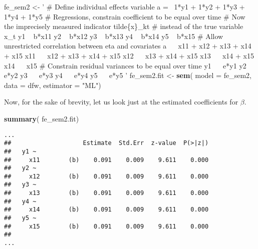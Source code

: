\documentclass[]{interact}
\theoremstyle{plain}%
\theoremstyle{definition}
\theoremstyle{remark}
\newenvironment{Shaded}{\begin{snugshade}}{\end{snugshade}}
\newcommand{\DataTypeTok}[1]{\textcolor[rgb]{0.13,0.29,0.53}{#1}}
\newcommand{\KeywordTok}[1]{\textcolor[rgb]{0.13,0.29,0.53}{\textbf{#1}}}
\newcommand{\NormalTok}[1]{#1}
\newcommand{\StringTok}[1]{\textcolor[rgb]{0.31,0.60,0.02}{#1}}
\begin{document}
\begin{Shaded}
\begin{Highlighting}[]
\NormalTok{fe_sem2 <-}\StringTok{ '}
\StringTok{# Define individual effects variable }
\StringTok{a =~ 1*y1 + 1*y2 + 1*y3 + 1*y4 + 1*y5}
\StringTok{# Regressions, constrain coefficient to be equal over time}
\StringTok{# Now the imprecisely measured indicator tilde\{x\}_kt}
\StringTok{# instead of the true variable x_t}
\StringTok{y1 ~ b*x11 }
\StringTok{y2 ~ b*x12 }
\StringTok{y3 ~ b*x13}
\StringTok{y4 ~ b*x14}
\StringTok{y5 ~ b*x15}
\StringTok{# Allow unrestricted correlation between eta and covariates}
\StringTok{a ~~ x11 + x12 + x13 + x14 + x15}
\StringTok{x11 ~~ x12 + x13 + x14 + x15}
\StringTok{x12 ~~ x13 + x14 + x15}
\StringTok{x13 ~~ x14 + x15}
\StringTok{x14 ~~ x15}
\StringTok{# Constrain residual variances to be equal over time}
\StringTok{y1 ~~ e*y1}
\StringTok{y2 ~~ e*y2}
\StringTok{y3 ~~ e*y3}
\StringTok{y4 ~~ e*y4}
\StringTok{y5 ~~ e*y5}
\StringTok{'}
\NormalTok{fe_sem2.fit <-}\StringTok{ }\KeywordTok{sem}\NormalTok{( }\DataTypeTok{model =}\NormalTok{ fe_sem2, }
                    \DataTypeTok{data =}\NormalTok{ dfw, }
                    \DataTypeTok{estimator =} \StringTok{"ML"}\NormalTok{)}
\end{Highlighting}
\end{Shaded}

\doublespacing

Now, for the sake of brevity, let us look just at the estimated
coefficients for \(\beta\).

\singlespacing

\begin{Shaded}
\begin{Highlighting}[]
\KeywordTok{summary}\NormalTok{( fe_sem2.fit)}
\end{Highlighting}
\end{Shaded}

\begin{verbatim}
...
##                    Estimate  Std.Err  z-value  P(>|z|)
##   y1 ~                                                
##     x11        (b)    0.091    0.009    9.611    0.000
##   y2 ~                                                
##     x12        (b)    0.091    0.009    9.611    0.000
##   y3 ~                                                
##     x13        (b)    0.091    0.009    9.611    0.000
##   y4 ~                                                
##     x14        (b)    0.091    0.009    9.611    0.000
##   y5 ~                                                
##     x15        (b)    0.091    0.009    9.611    0.000
## 
...
\end{verbatim}
\end{document}
